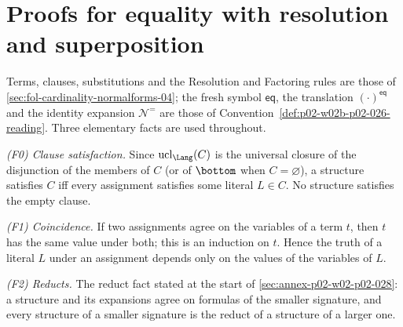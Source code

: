\section{Proofs for equality with resolution and superposition}
\label{sec:annex-p02-w02b-p02-026}

Terms, clauses, substitutions and the Resolution and Factoring rules are those
of \cref{sec:fol-cardinality-normalforms-04}; the fresh symbol
\(\mathsf{eq}\), the translation \((\cdot)^{\mathsf{eq}}\) and the identity
expansion \(\mathcal N^{=}\) are those of
Convention~\ref{def:p02-w02b-p02-026-reading}.  Three elementary facts are
used throughout.

\emph{(F0) Clause satisfaction.}  Since \(\operatorname{ucl}_{\Lang}(C)\) is
the universal closure of the disjunction of the members of \(C\) (or of
\(\bottom\) when \(C=\varnothing\)), a structure satisfies \(C\) iff every
assignment satisfies some literal \(L\in C\).  No structure satisfies the
empty clause.

\emph{(F1) Coincidence.}  If two assignments agree on the variables of a term
\(t\), then \(t\) has the same value under both; this is an induction on
\(t\).  Hence the truth of a literal \(L\) under an assignment depends only
on the values of the variables of \(L\).

\emph{(F2) Reducts.}  The reduct fact stated at the start of
\cref{sec:annex-p02-w02-p02-028}: a structure and its expansions agree on
formulas of the smaller signature, and every structure of a smaller signature
is the reduct of a structure of a larger one.

